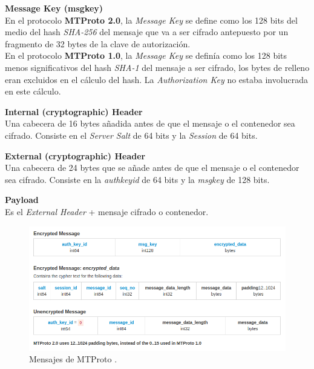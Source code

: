 \begin{description}
	\item \textbf{Message Key (msg\textunderscore key)}\\
	En el protocolo \textbf{MTProto 2.0}, la \emph{Message Key} se define como los 128 bits del medio del hash \emph{SHA-256} del mensaje que va a ser cifrado antepuesto por un fragmento de 32 bytes de la clave de autorización.\\
	En el protocolo \textbf{MTProto 1.0}, la \emph{Message Key} se definía como los 128 bits menos significativos del hash \emph{SHA-1} del mensaje a ser cifrado, los bytes de relleno eran excluidos en el cálculo del hash. La \emph{Authorization Key} no estaba involucrada en este cálculo.

	\item \textbf{Internal (cryptographic) Header}\\
	Una cabecera de 16 bytes añadida antes de que el mensaje o el contenedor sea cifrado. Consiste en el \emph{Server Salt} de 64 bits y la \emph{Session} de 64 bits.

	\item \textbf{External (cryptographic) Header}\\
	Una cabecera de 24 bytes que se añade antes de que el mensaje o el contenedor sea cifrado. Consiste en la \emph{auth\textunderscore key\textunderscore id} de 64 bits y la \emph{msg\textunderscore key} de 128 bits.

	\item \textbf{Payload}\\
	Es el \emph{External Header} + mensaje cifrado o contenedor.
\end{description}

\begin{figure}[htb]
	\centering
	\includegraphics[scale=0.5]{imagenes/MTProto2.png} 
	\caption{Mensajes de MTProto \cite{WebProto}.}
	\label{mtproto1}
\end{figure}

